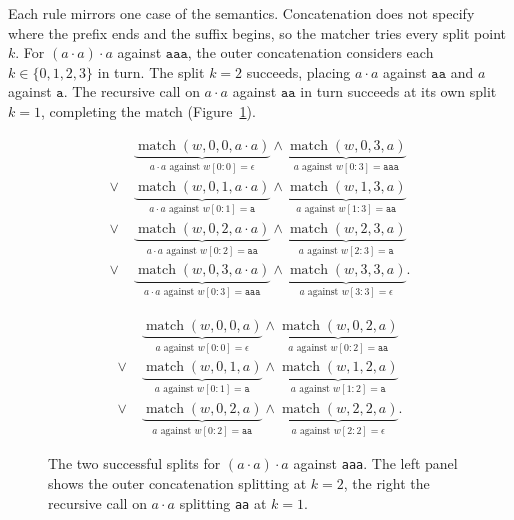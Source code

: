 Each rule mirrors one case of the semantics.
Concatenation does not specify where the prefix ends and the suffix begins, 
so the matcher tries every split point $k$.
For $(a\cdot a)\cdot a$ against $\mathtt{aaa}$, 
the outer concatenation considers each $k\in\{0,1,2,3\}$ in turn. 
The split $k=2$ succeeds,
placing $a\cdot a$ against $\mathtt{aa}$ and $a$ against $\mathtt{a}$.
The recursive call on $a\cdot a$ against $\mathtt{aa}$
in turn succeeds at its own split $k=1$, completing the match
(Figure~\ref{fig:naive-splits}).
\begin{figure}[ht]
\centering
\begin{minipage}[t]{0.49\textwidth}
\footnotesize
\[
\begin{aligned}
&\underbrace{\operatorname{match}(w,0,0,a\cdot a)}_
  {\text{$a\cdot a$ against }w[0:0]=\mathtt{\epsilon}}
  \land
  \underbrace{\operatorname{match}(w,0,3,a)}_
  {\text{$a$ against }w[0:3]=\mathtt{aaa}}
\\[4pt]
{}\lor\;&
\underbrace{\operatorname{match}(w,0,1,a\cdot a)}_
  {\text{$a\cdot a$ against }w[0:1]=\mathtt{a}}
  \land
  \underbrace{\operatorname{match}(w,1,3,a)}_
  {\text{$a$ against }w[1:3]=\mathtt{aa}}
\\[4pt]
{}\lor\;&
\underbrace{\operatorname{match}(w,0,2,a\cdot a)}_
  {\text{$a\cdot a$ against }w[0:2]=\mathtt{aa}}
  \land
  \underbrace{\operatorname{match}(w,2,3,a)}_
  {\text{$a$ against }w[2:3]=\mathtt{a}}
\\[4pt]
{}\lor\;&
\underbrace{\operatorname{match}(w,0,3,a\cdot a)}_
  {\text{$a\cdot a$ against }w[0:3]=\mathtt{aaa}}
  \land
  \underbrace{\operatorname{match}(w,3,3,a)}_
  {\text{$a$ against }w[3:3]=\mathtt{\epsilon}}.
\end{aligned}
\]
\end{minipage}\hfill
\begin{minipage}[t]{0.49\textwidth}
\footnotesize
\[
\begin{aligned}
&\underbrace{\operatorname{match}(w,0,0,a)}_
  {\text{$a$ against }w[0:0]=\mathtt{\epsilon}}
  \land
  \underbrace{\operatorname{match}(w,0,2,a)}_
  {\text{$a$ against }w[0:2]=\mathtt{aa}}
\\[4pt]
{}\lor\;&
\underbrace{\operatorname{match}(w,0,1,a)}_
  {\text{$a$ against }w[0:1]=\mathtt{a}}
  \land
  \underbrace{\operatorname{match}(w,1,2,a)}_
  {\text{$a$ against }w[1:2]=\mathtt{a}}
\\[4pt]
{}\lor\;&
\underbrace{\operatorname{match}(w,0,2,a)}_
  {\text{$a$ against }w[0:2]=\mathtt{aa}}
  \land
  \underbrace{\operatorname{match}(w,2,2,a)}_
  {\text{$a$ against }w[2:2]=\mathtt{\epsilon}}.
\end{aligned}
\]
\end{minipage}
\caption{The two successful splits for $(a\cdot a)\cdot a$ against \texttt{aaa}. 
The left panel shows the outer concatenation splitting at $k=2$,
the right the recursive call on $a\cdot a$
splitting \texttt{aa} at $k=1$.}
\label{fig:naive-splits}
\end{figure}

